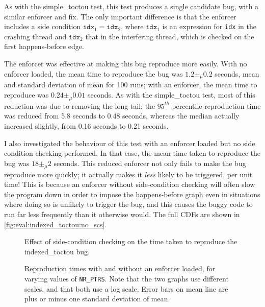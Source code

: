 As with the simple\_toctou test, this test produces a single candidate
bug, with a similar enforcer and fix.  The only important difference
is that the enforcer includes a side condition $\mathtt{idx}_1 =
\mathtt{idx}_2$, where $\mathtt{idx}_1$ is an expression for
\texttt{idx} in the crashing thread and $\mathtt{idx}_2$ that in the
interfering thread, which is checked on the first happens-before edge.

The enforcer was effective at making this bug reproduce more easily.
With no enforcer loaded, the mean time to reproduce the bug was $1.2
\pm_\mu 0.2$ seconds, mean and standard deviation of mean for 100
runs; with an enforcer, the mean time to reproduce was $0.24 \pm_\mu
0.01$ seconds.  As with the simple\_toctou test, most of this
reduction was due to removing the long tail: the $95^{th}$ percentile
reproduction time was reduced from 5.8 seconds to 0.48 seconds,
whereas the median actually increased slightly, from 0.16 seconds to
0.21 seconds.  

I also investigated the behaviour of this test with an enforcer loaded
but no side condition checking performed.  In that case, the mean time
taken to reproduce the bug was $18 \pm_\mu 2$ seconds.  This reduced
enforcer not only fails to make the bug reproduce more quickly; it
actually makes it \emph{less} likely to be triggered, per unit time!
This is because an enforcer without side-condition checking will often
slow the program down in order to impose the happens-before graph even
in situations where doing so is unlikely to trigger the bug, and this
causes the buggy code to run far less frequently than it otherwise
would.  The full CDFs are shown in
\autoref{fig:eval:indexed_toctou:no_scs}.

\begin{figure}
  
  \caption{Effect of side-condition checking on the time taken to
    reproduce the indexed\_toctou bug.}
  \label{fig:eval:indexed_toctou:no_scs}
\end{figure}

\begin{figure}
  \caption{Reproduction times with and without an enforcer loaded, for
    varying values of \texttt{NR\_PTRS}.  Note that the two graphs use
    different scales, and that both use a log scale.  Error bars on
    mean line are plus or minus one standard deviation of mean.}
  \label{fig:eval:indexed_toctou:nr_ptrs}
\end{figure}

